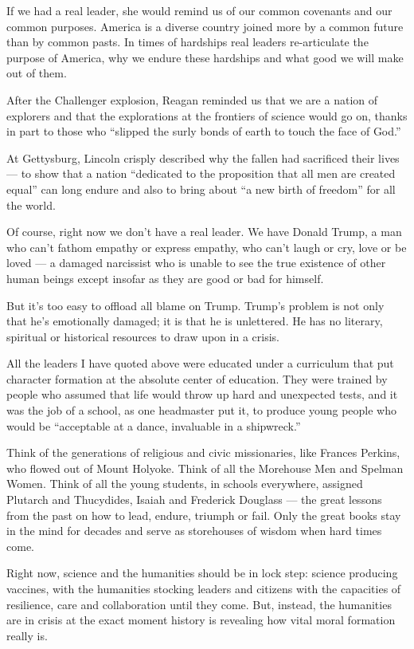 If we had a real leader, she would remind us of our common covenants and
our common purposes. America is a diverse country joined more by a
common future than by common pasts. In times of hardships real leaders
re-articulate the purpose of America, why we endure these hardships and
what good we will make out of them.

After the Challenger explosion, Reagan reminded us that we are a nation
of explorers and that the explorations at the frontiers of science would
go on, thanks in part to those who ``slipped the surly bonds of earth to
touch the face of God.''

At Gettysburg, Lincoln crisply described why the fallen had sacrificed
their lives --- to show that a nation ``dedicated to the proposition
that all men are created equal'' can long endure and also to bring about
``a new birth of freedom'' for all the world.

Of course, right now we don't have a real leader. We have Donald Trump,
a man who can't fathom empathy or express empathy, who can't laugh or
cry, love or be loved --- a damaged narcissist who is unable to see the
true existence of other human beings except insofar as they are good or
bad for himself.

But it's too easy to offload all blame on Trump. Trump's problem is not
only that he's emotionally damaged; it is that he is unlettered. He has
no literary, spiritual or historical resources to draw upon in a crisis.

All the leaders I have quoted above were educated under a curriculum
that put character formation at the absolute center of education. They
were trained by people who assumed that life would throw up hard and
unexpected tests, and it was the job of a school, as one headmaster put
it, to produce young people who would be ``acceptable at a dance,
invaluable in a shipwreck.''

Think of the generations of religious and civic missionaries, like
Frances Perkins, who flowed out of Mount Holyoke. Think of all the
Morehouse Men and Spelman Women. Think of all the young students, in
schools everywhere, assigned Plutarch and Thucydides, Isaiah and
Frederick Douglass --- the great lessons from the past on how to lead,
endure, triumph or fail. Only the great books stay in the mind for
decades and serve as storehouses of wisdom when hard times come.

Right now, science and the humanities should be in lock step: science
producing vaccines, with the humanities stocking leaders and citizens
with the capacities of resilience, care and collaboration until they
come. But, instead, the humanities are in crisis at the exact moment
history is revealing how vital moral formation really is.

